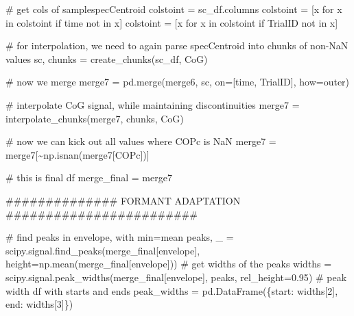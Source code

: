 \documentclass[
  letterpaper,
  DIV=11,
  numbers=noendperiod]{scrreprt}
\newenvironment{Shaded}{\begin{snugshade}}{\end{snugshade}}
\newcommand{\CommentTok}[1]{\textcolor[rgb]{0.37,0.37,0.37}{#1}}
\newcommand{\ControlFlowTok}[1]{\textcolor[rgb]{0.00,0.23,0.31}{#1}}
\newcommand{\DecValTok}[1]{\textcolor[rgb]{0.68,0.00,0.00}{#1}}
\newcommand{\FloatTok}[1]{\textcolor[rgb]{0.68,0.00,0.00}{#1}}
\newcommand{\KeywordTok}[1]{\textcolor[rgb]{0.00,0.23,0.31}{#1}}
\newcommand{\NormalTok}[1]{\textcolor[rgb]{0.00,0.23,0.31}{#1}}
\newcommand{\OperatorTok}[1]{\textcolor[rgb]{0.37,0.37,0.37}{#1}}
\newcommand{\StringTok}[1]{\textcolor[rgb]{0.13,0.47,0.30}{#1}}
\begin{document}
\begin{Shaded}
\begin{Highlighting}[]
    \CommentTok{\# get cols of samplespecCentroid}
\NormalTok{    colstoint }\OperatorTok{=}\NormalTok{ sc\_df.columns}
\NormalTok{    colstoint }\OperatorTok{=}\NormalTok{ [x }\ControlFlowTok{for}\NormalTok{ x }\KeywordTok{in}\NormalTok{ colstoint }\ControlFlowTok{if} \StringTok{\textquotesingle{}time\textquotesingle{}} \KeywordTok{not} \KeywordTok{in}\NormalTok{ x]}
\NormalTok{    colstoint }\OperatorTok{=}\NormalTok{ [x }\ControlFlowTok{for}\NormalTok{ x }\KeywordTok{in}\NormalTok{ colstoint }\ControlFlowTok{if} \StringTok{\textquotesingle{}TrialID\textquotesingle{}} \KeywordTok{not} \KeywordTok{in}\NormalTok{ x]}

    \CommentTok{\# for interpolation, we need to again parse specCentroid into chunks of non{-}NaN values}
\NormalTok{    sc, chunks }\OperatorTok{=}\NormalTok{ create\_chunks(sc\_df, }\StringTok{\textquotesingle{}CoG\textquotesingle{}}\NormalTok{)}
    
    \CommentTok{\# now we merge}
\NormalTok{    merge7 }\OperatorTok{=}\NormalTok{ pd.merge(merge6, sc, on}\OperatorTok{=}\NormalTok{[}\StringTok{\textquotesingle{}time\textquotesingle{}}\NormalTok{, }\StringTok{\textquotesingle{}TrialID\textquotesingle{}}\NormalTok{], how}\OperatorTok{=}\StringTok{\textquotesingle{}outer\textquotesingle{}}\NormalTok{)}

    \CommentTok{\# interpolate CoG signal, while maintaining discontinuities}
\NormalTok{    merge7 }\OperatorTok{=}\NormalTok{ interpolate\_chunks(merge7, chunks, }\StringTok{\textquotesingle{}CoG\textquotesingle{}}\NormalTok{)}

    \CommentTok{\# now we can kick out all values where COPc is NaN}
\NormalTok{    merge7 }\OperatorTok{=}\NormalTok{ merge7[}\OperatorTok{\textasciitilde{}}\NormalTok{np.isnan(merge7[}\StringTok{\textquotesingle{}COPc\textquotesingle{}}\NormalTok{])]}

    \CommentTok{\# this is final df}
\NormalTok{    merge\_final }\OperatorTok{=}\NormalTok{ merge7     }

    \CommentTok{\#\#\#\#\#\#\#\#\#\#\#\#\#\# FORMANT ADAPTATION \#\#\#\#\#\#\#\#\#\#\#\#\#\#\#\#\#\#\#\#\#\#\#\#}

    \CommentTok{\# find peaks in envelope, with min=mean}
\NormalTok{    peaks, \_ }\OperatorTok{=}\NormalTok{ scipy.signal.find\_peaks(merge\_final[}\StringTok{\textquotesingle{}envelope\textquotesingle{}}\NormalTok{], height}\OperatorTok{=}\NormalTok{np.mean(merge\_final[}\StringTok{\textquotesingle{}envelope\textquotesingle{}}\NormalTok{]))}
    \CommentTok{\# get widths of the peaks}
\NormalTok{    widths }\OperatorTok{=}\NormalTok{ scipy.signal.peak\_widths(merge\_final[}\StringTok{\textquotesingle{}envelope\textquotesingle{}}\NormalTok{], peaks, rel\_height}\OperatorTok{=}\FloatTok{0.95}\NormalTok{)}
    \CommentTok{\# peak width df with starts and ends}
\NormalTok{    peak\_widths }\OperatorTok{=}\NormalTok{ pd.DataFrame(\{}\StringTok{\textquotesingle{}start\textquotesingle{}}\NormalTok{: widths[}\DecValTok{2}\NormalTok{], }\StringTok{\textquotesingle{}end\textquotesingle{}}\NormalTok{: widths[}\DecValTok{3}\NormalTok{]\})}


\end{Highlighting}
\end{Shaded}
\end{document}
